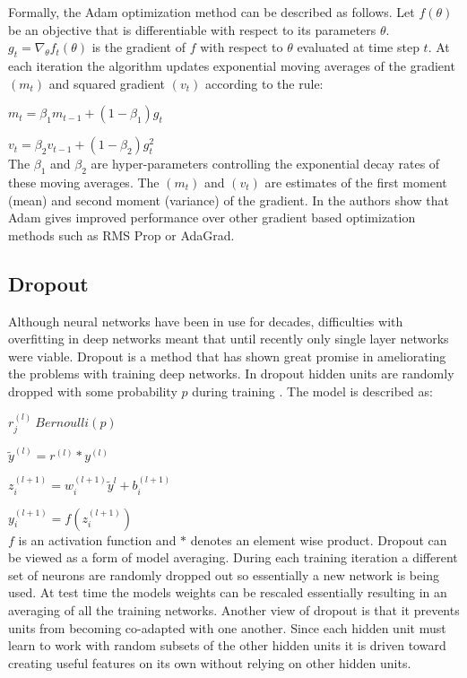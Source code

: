 \documentclass[12pt,letterpaper]{article}
\begin{document}
Formally, the Adam optimization method can be described as follows.  Let $f(\theta)$ be an objective that is differentiable with respect to its parameters $\theta$.  $g_t = \nabla_{\theta}f_t(\theta)$ is the gradient of $f$ with respect to $\theta$ evaluated at time step $t$.   At each iteration the algorithm updates exponential moving averages of the gradient $(m_t)$ and squared gradient $(v_t)$ according to the rule:

$m_t = \beta_1 m_{t-1} + (1 - \beta_1) g_t$

$v_t = \beta_2 v_{t-1} + (1 - \beta_2) g_t^2$
\\
The $\beta_1$ and $\beta_2$ are hyper-parameters controlling the exponential decay rates of these moving averages.  The $(m_t)$ and  $(v_t)$ are estimates of the first moment (mean) and second moment (variance) of the gradient. In \cite{journals/corr/KingmaB14} the authors show that Adam gives improved performance over other gradient based optimization methods such as RMS Prop or AdaGrad.

\subsection{Dropout}
Although neural networks have been in use for decades, difficulties with overfitting in deep networks meant that until recently only single layer networks were viable.  Dropout is a method that has shown great promise in ameliorating the problems with training deep networks.  In dropout hidden units are randomly dropped with some probability $p$ during training \cite{Srivastava:2014:DSW:2627435.2670313}.  The model is described as:

$r_j^{(l)} ~ Bernoulli(p)$

$\tilde{y}^{(l)} = r^{(l)} * y^{(l)}$

$z_i^{(l + 1)} = w_i^{(l + 1)}\tilde{y}^l + b_i^{(l + 1)}$

$y_i^{(l + 1)} = f(z_i^{(l + 1)})$
\\
$f$ is an activation function and $*$ denotes an element wise product.  Dropout can be viewed as a form of model averaging.  During each training iteration a different set of neurons are randomly dropped out so essentially a new network is being used.  At test time the models weights can be rescaled essentially resulting in an averaging of all the training networks.  Another view of dropout is that it prevents units from becoming co-adapted with one another.  Since each hidden unit must learn to work with random subsets of the other hidden units it is driven toward creating useful features on its own without relying on other hidden units.
\end{document}
